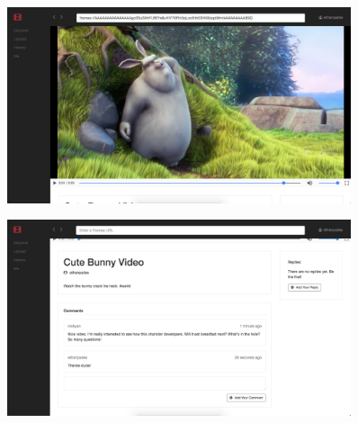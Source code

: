 \documentclass[final]{beamer}
\newlength{\sepwid}
\newlength{\onecolwid}
\newlength{\twocolwid}
\begin{document}
\begin{frame}[t]
\begin{columns}[t]
\begin{column}{\twocolwid}
\begin{columns}[t,totalwidth=\twocolwid]
\end{columns} %

\end{column} %

\begin{column}{\sepwid}\end{column} %

\begin{column}{\onecolwid} %


\begin{block}{}


  \begin{figure}
  \includegraphics[width=0.8\linewidth]{watch-page.png}
  \captionsetup{labelformat=empty}
  \label{fig:watch-page}
  \end{figure}

  \begin{figure}
  \includegraphics[width=0.8\linewidth]{watch-page-comments.png}
  \captionsetup{labelformat=empty}
  \label{fig:watch-page-comments}
  \end{figure}


\end{block}
\end{column}
\end{columns}
\end{frame}
\end{document}
